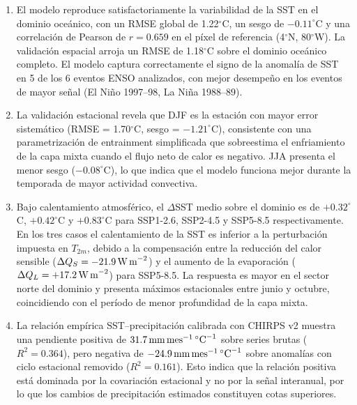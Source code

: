 \documentclass[12pt, a4paper]{article}
\begin{document}
\begin{enumerate}
	
	\item El modelo reproduce satisfactoriamente la variabilidad de la SST en el 
	dominio oce\'anico, con un RMSE global de 1.22$^{\circ}$C, un sesgo de 
	$-0.11^{\circ}$C y una correlaci\'on de Pearson de $r = 0.659$ en el p\'ixel 
	de referencia (4$^{\circ}$N, 80$^{\circ}$W). La validaci\'on espacial arroja 
	un RMSE de 1.18$^{\circ}$C sobre el dominio oce\'anico completo. El modelo 
	captura correctamente el signo de la anomal\'ia de SST en 5 de los 6 eventos 
	ENSO analizados, con mejor desempe\~no en los eventos de mayor se\~nal 
	(El Ni\~no 1997--98, La Ni\~na 1988--89).
	
	\item La validaci\'on estacional revela que DJF es la estaci\'on con mayor 
	error sistem\'atico (RMSE = 1.70$^{\circ}$C, sesgo = $-1.21^{\circ}$C), 
	consistente con una parametrizaci\'on de entrainment simplificada que 
	sobreestima el enfriamiento de la capa mixta cuando el flujo neto de calor 
	es negativo. JJA presenta el menor sesgo ($-0.08^{\circ}$C), lo que indica 
	que el modelo funciona mejor durante la temporada de mayor actividad 
	convectiva.
	
	\item Bajo calentamiento atmosf\'erico, el $\Delta$SST medio sobre el dominio 
	es de $+0.32^{\circ}$C, $+0.42^{\circ}$C y $+0.83^{\circ}$C para SSP1-2.6, 
	SSP2-4.5 y SSP5-8.5 respectivamente. En los tres casos el calentamiento de 
	la SST es inferior a la perturbaci\'on impuesta en $T_{2m}$, debido a la 
	compensaci\'on entre la reducci\'on del calor sensible 
	($\Delta Q_S = -21.9\,\text{W\,m}^{-2}$) y el aumento de la evaporaci\'on 
	($\Delta Q_L = +17.2\,\text{W\,m}^{-2}$) para SSP5-8.5. La respuesta es 
	mayor en el sector norte del dominio y presenta m\'aximos estacionales entre 
	junio y octubre, coincidiendo con el per\'iodo de menor profundidad de la 
	capa mixta.
	
	\item La relaci\'on emp\'irica SST--precipitaci\'on calibrada con CHIRPS v2 
	muestra una pendiente positiva de $31.7\,\text{mm\,mes}^{-1}\,^{\circ}\text{C}^{-1}$ 
	sobre series brutas ($R^2 = 0.364$), pero negativa de 
	$-24.9\,\text{mm\,mes}^{-1}\,^{\circ}\text{C}^{-1}$ sobre anomal\'ias con 
	ciclo estacional removido ($R^2 = 0.161$). Esto indica que la relaci\'on 
	positiva est\'a dominada por la covariaci\'on estacional y no por la se\~nal 
	interanual, por lo que los cambios de precipitaci\'on estimados constituyen 
	cotas superiores.
	

\end{enumerate}
\end{document}
